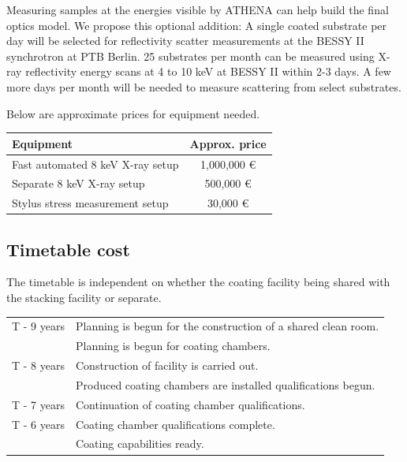 Measuring samples at the energies visible by ATHENA can help build the final optics model. We propose this optional addition: A single coated substrate per day will be selected for reflectivity scatter measurements at the BESSY II synchrotron at PTB Berlin. 25 substrates per month can be measured using X-ray reflectivity energy scans at 4 to 10 keV at BESSY II within 2-3 days. A few more days per month will be needed to measure scattering from select substrates.

Below are approximate prices for equipment needed.

\begin{table}[htbp]
	\centering
\begin{tabular}{l|c}
Equipment & Approx. price\\
\hline
\hline
Fast automated 8 keV X-ray setup  & 1,000,000 \euro\\
\hline
Separate 8 keV X-ray setup & 500,000 \euro\\
\hline
Stylus stress measurement setup & 30,000 \euro\\
\end{tabular}
\end{table}



\subsection{Timetable cost}

The timetable is independent on whether the coating facility being shared with the stacking facility or separate.\\

\begin{table}[htbp]
	\centering
\begin{tabular}{c|l}
T - 9 years & Planning is begun for the construction of a shared clean room. \\
			& Planning is begun for coating chambers.\\
\hline
T - 8 years & Construction of facility is carried out.\\
			& Produced coating chambers are installed qualifications begun.\\
\hline
T - 7 years & Continuation of coating chamber qualifications.\\
\hline
T - 6 years & Coating chamber qualifications complete.\\
			& Coating capabilities ready.\\

\end{tabular}
\end{table}

